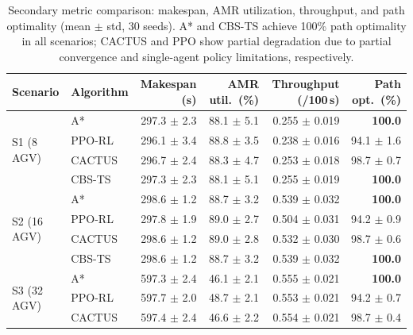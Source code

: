 \begin{table}[htbp]
  \centering
  \caption{Secondary metric comparison: makespan, AMR utilization,
           throughput, and path optimality (mean $\pm$ std, 30 seeds).
           A* and CBS-TS achieve 100\% path optimality in all scenarios;
           CACTUS and PPO show partial degradation due to partial convergence
           and single-agent policy limitations, respectively.}
  \label{tab:8}
  \small
  \begin{threeparttable}
    \begin{tabular}{llrrrr}
      \toprule
      \textbf{Scenario}
        & \textbf{Algorithm}
        & \textbf{Makespan (s)}
        & \textbf{AMR util.\ (\%)}
        & \textbf{Throughput (/100\,s)}
        & \textbf{Path opt.\ (\%)} \\
      \midrule
      \multirow{4}{*}{S1 (8\,AGV)}
        & A*      & 297.3 $\pm$ 2.3 & 88.1 $\pm$ 5.1 & 0.255 $\pm$ 0.019 & \textbf{100.0} \\
        & PPO-RL  & 296.1 $\pm$ 3.4 & 88.8 $\pm$ 3.5 & 0.238 $\pm$ 0.016 & 94.1 $\pm$ 1.6 \\
        & CACTUS  & 296.7 $\pm$ 2.4 & 88.3 $\pm$ 4.7 & 0.253 $\pm$ 0.018 & 98.7 $\pm$ 0.7 \\
        & CBS-TS  & 297.3 $\pm$ 2.3 & 88.1 $\pm$ 5.1 & 0.255 $\pm$ 0.019 & \textbf{100.0} \\
      \midrule
      \multirow{4}{*}{S2 (16\,AGV)}
        & A*      & 298.6 $\pm$ 1.2 & 88.7 $\pm$ 3.2 & 0.539 $\pm$ 0.032 & \textbf{100.0} \\
        & PPO-RL  & 297.8 $\pm$ 1.9 & 89.0 $\pm$ 2.7 & 0.504 $\pm$ 0.031 & 94.2 $\pm$ 0.9 \\
        & CACTUS  & 298.6 $\pm$ 1.2 & 89.0 $\pm$ 2.8 & 0.532 $\pm$ 0.030 & 98.7 $\pm$ 0.6 \\
        & CBS-TS  & 298.6 $\pm$ 1.2 & 88.7 $\pm$ 3.2 & 0.539 $\pm$ 0.032 & \textbf{100.0} \\
      \midrule
      \multirow{4}{*}{S3 (32\,AGV)}
        & A*      & 597.3 $\pm$ 2.4 & 46.1 $\pm$ 2.1 & 0.555 $\pm$ 0.021 & \textbf{100.0} \\
        & PPO-RL  & 597.7 $\pm$ 2.0 & 48.7 $\pm$ 2.1 & 0.553 $\pm$ 0.021 & 94.2 $\pm$ 0.7 \\
        & CACTUS  & 597.4 $\pm$ 2.4 & 46.6 $\pm$ 2.2 & 0.554 $\pm$ 0.021 & 98.7 $\pm$ 0.4 \\

\end{tabular}
\end{threeparttable}
\end{table}
